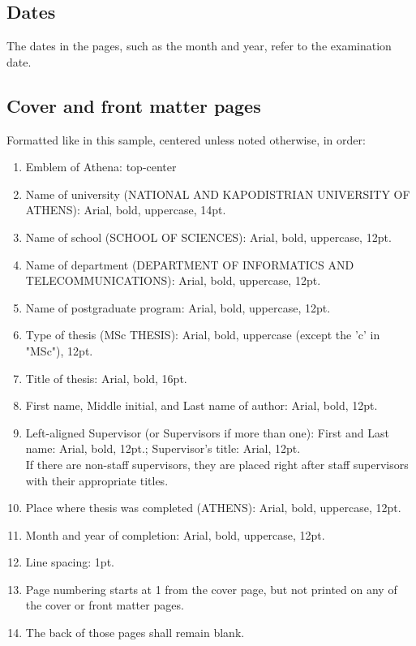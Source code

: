 \documentclass[en,inscr,ack,preface]{dimscthesis}
\begin{document}
\subsection{Dates} \label{dates}

The dates in the pages, such as the month and year, refer to the examination date.

\subsection{Cover and front matter pages} \label{cover_and_front_matter_pages}

Formatted like in this sample, centered unless noted otherwise, in order:

\begin{enumerate}
    \item Emblem of Athena: top-center
    \item Name of university (NATIONAL AND KAPODISTRIAN UNIVERSITY OF ATHENS): Arial, bold, uppercase, 14pt.
    \item Name of school (SCHOOL OF SCIENCES): Arial, bold, uppercase, 12pt.
    \item Name of department (DEPARTMENT OF INFORMATICS AND TELECOMMUNICATIONS): Arial, bold, uppercase, 12pt.
    \item Name of postgraduate program: Arial, bold, uppercase, 12pt.
    \item Type of thesis (MSc THESIS): Arial, bold, uppercase (except the 'c' in "MSc"), 12pt.
    \item Title of thesis: Arial, bold, 16pt.
    \item First name, Middle initial, and Last name of author: Arial, bold, 12pt.
    \item Left-aligned Supervisor (or Supervisors if more than one): First and Last name: Arial, bold, 12pt.; Supervisor's title: Arial, 12pt.\\
    If there are non-staff supervisors, they are placed right after staff supervisors with their appropriate titles.
    \item Place where thesis was completed (ATHENS): Arial, bold, uppercase, 12pt.
    \item Month and year of completion: Arial, bold, uppercase, 12pt.
    \item Line spacing: 1pt.
    \item Page numbering starts at 1 from the cover page, but not printed on any of the cover or front matter pages.
    \item The back of those pages shall remain blank.
\end{enumerate}
\end{document}
